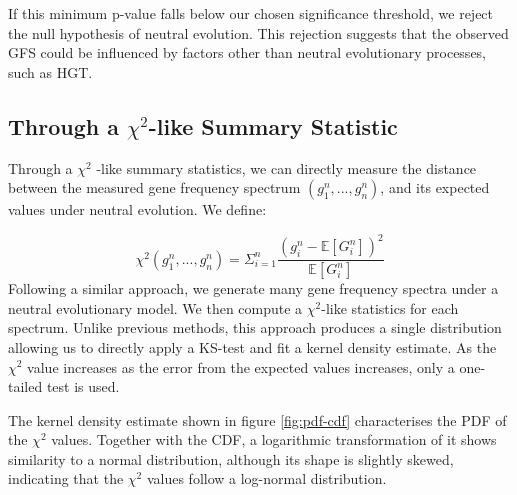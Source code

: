 If this minimum p-value falls below our chosen significance threshold, we reject the null hypothesis of neutral evolution.
This rejection suggests that the observed \ac{GFS} could be influenced by factors other than neutral evolutionary processes, such as \ac{HGT}.

\subsection{Through a $\chi^2$-like Summary Statistic}\label{subsec:chi}
Through a $\chi^2$ -like summary statistics, we can directly measure the distance between the measured gene frequency spectrum $(g_1^n, ..., g_n^n)$, and its expected values under neutral evolution.
We define:

\begin{equation}
    \chi^2(g_1^n, ..., g_n^n) = \Sigma^n_{i=1} \frac{(g_i^n-\mathbb{E}[G_i^n])^2}{\mathbb{E}[G_i^n]}
\end{equation}
Following a similar approach, we generate many gene frequency spectra under a neutral evolutionary model.
We then compute a $\chi^2$-like statistics for each spectrum.
Unlike previous methods, this approach produces a single distribution allowing us to directly apply a \ac{KS}-test and fit a kernel density estimate.
As the $\chi^2$ value increases as the error from the expected values increases, only a one-tailed test is used.

The kernel density estimate shown in figure \ref{fig:pdf-cdf} characterises the \ac{PDF} of the $\chi^2$ values.
Together with the \ac{CDF}, a logarithmic transformation of it shows similarity to a normal distribution, although its shape is slightly skewed, indicating that the $\chi^2$ values follow a log-normal distribution.

